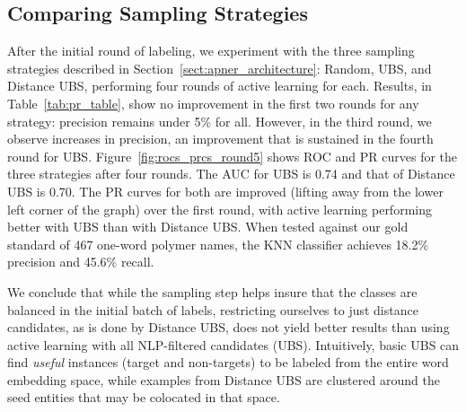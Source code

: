 \subsection{Comparing Sampling Strategies}
After the initial round of labeling, we experiment with the three sampling strategies described in Section~\ref{sect:apner_architecture}: Random, UBS, and Distance UBS,
performing four rounds of active learning for each.
Results, in Table~\ref{tab:pr_table}, show
no improvement in the first two rounds for any strategy: %
precision remains under 5\% for all.
However, in the third round, we observe increases in precision,
an improvement that  
is sustained in the fourth round for UBS.
Figure~\ref{fig:rocs_prcs_round5} shows ROC and PR curves for the three strategies after four rounds. 
The AUC for UBS is 0.74 and that of Distance UBS is 0.70. 
The PR curves for both are improved (lifting away from the lower left corner of the graph) over the first round, 
with active learning performing better with UBS than with Distance UBS.
When tested against our gold standard of 467 one-word polymer names, 
the KNN classifier achieves 18.2\% precision and  45.6\% recall. 

We conclude that while the sampling step
helps insure that the classes are balanced in the initial batch of labels, 
restricting ourselves to just distance candidates, as is done by Distance UBS, does not yield better results than using active learning with all NLP-filtered candidates (UBS).
Intuitively, basic UBS can find \textit{useful} instances (target and non-targets) to be labeled from the entire word embedding space, 
while examples from Distance UBS are clustered around the seed entities that may be colocated in that space.


